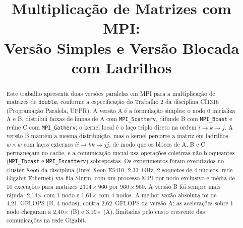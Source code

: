 \documentclass[conference]{IEEEtran}
\begin{document}
\title{Multiplicação de Matrizes com MPI:\\
Versão Simples e Versão Blocada com Ladrilhos}

\author{
    \vspace{0.2cm}
}

\maketitle

\begin{abstract}
Este trabalho apresenta duas versões paralelas em MPI para a multiplicação
de matrizes de \texttt{double}, conforme a especificação do Trabalho 2 da
disciplina CI1316 (Programação Paralela, UFPR). A versão A é a formulação
simples: o nodo 0 inicializa A e B, distribui faixas de linhas de A com
\texttt{MPI\_Scatterv}, difunde B com \texttt{MPI\_Bcast} e reúne C com
\texttt{MPI\_Gatherv}; o kernel local é o laço triplo direto na ordem
$i \rightarrow k \rightarrow j$. A versão B mantém a mesma distribuição, mas
o kernel percorre a matriz em ladrilhos $w \times w$ com laços externos
$ii \rightarrow kk \rightarrow jj$, de modo que os blocos de A, B e C
permaneçam no cache, e a comunicação inicial usa operações coletivas não
bloqueantes (\texttt{MPI\_Ibcast} e \texttt{MPI\_Iscatterv}) sobrepostas.
Os experimentos foram executados no cluster Xeon da disciplina (Intel Xeon
E5410, 2,33~GHz, 2 soquetes de 4 núcleos, rede Gigabit Ethernet) via fila
Slurm, com um processo MPI por nodo exclusivo e média de 10 execuções para
matrizes $2304 \times 960$ por $960 \times 960$. A versão B foi sempre mais
rápida: 2,14$\times$ com 1 nodo e 1,61$\times$ com 4 nodos. A melhor vazão
absoluta foi de 4,21~GFLOPS (B, 4 nodos), contra 2,62~GFLOPS da versão A;
as acelerações sobre 1 nodo chegaram a 2,40$\times$ (B) e 3,19$\times$ (A),
limitadas pelo custo crescente das comunicações na rede Gigabit.
\end{abstract}
\end{document}
